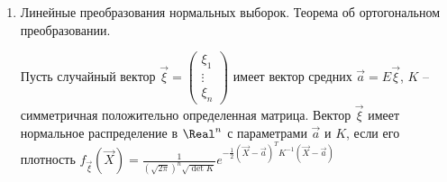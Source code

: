 \begin{enumerate}
\begin{enumerate}
        \item $\frac{\chi_k^2}{k} \overset{p}{\underset{k \to \infty}{\longrightarrow}} 1$ (по Закону Больших Чисел)
    \end{enumerate}

    \Def Пусть $X_0, X_1, \dots, X_k$ -- независимые стандартные нормальные величины. 
    Распределением Стьюдента $T_k$ с $k$ степенями свободы называется распределение случайной величины 
    $t_k = \frac{X_0}{\sqrt{\frac{1}{k} (X_1^2 + \dots + X_k^2)}} = \frac{X_0}{\sqrt{\frac{\chi_k^2}{k}}}$

    \underline{Свойства}

    \begin{enumerate}
        \item $Et_k = 0$ -- в силу симметрии

        \item $t_k \rightrightarrows N(0, 1)$ (на практике при $k \geq 100$ распределение Стьюдента можно считать стандартным нормальным)
    \end{enumerate}

    \Def Распределением Фишера-Снедекера $F_{n,m}$ (другое название -- F-распределение) со степенями свободы $n$ и $m$ называется распределение случайной величины 
    $f_{n,m} = \frac{\frac{\chi^2_n}{n}}{\frac{\chi^2_m}{m}}$, где $\chi_n^2$ и $\chi_m^2$ -- независимые случайные величины с распределением \enquote{хи-квадрат}

    \underline{Свойства}

    \begin{enumerate}
        \item $E f_{n,m} = \frac{m}{m - 2}$ при $m > 2$

        \item $f_{n,m} \overset{p}{\underset{n, m \to \infty}{\longrightarrow}} 1$
    \end{enumerate}

    \item Линейные преобразования нормальных выборок. Теорема об ортогональном преобразовании.

    \Def Пусть случайный вектор $\vec \xi = \begin{pmatrix}\xi_1 \\ \vdots \\ \xi_n\end{pmatrix}$ имеет вектор средних 
    $\vec a = E \vec \xi$, $K$ -- симметричная положительно определенная матрица. Вектор $\vec \xi$ 
    имеет нормальное распределение в $\Real^n$ с параметрами $\vec a$ и $K$, если его плотность 
    $f_{\vec \xi} (\vec X) = \frac{1}{\left(\sqrt{2\pi}\right)^n \sqrt{\det K}} e^{-\frac{1}{2} (\vec X - \vec a)^T K^{-1} (\vec X - \vec a)}$



\end{enumerate}
